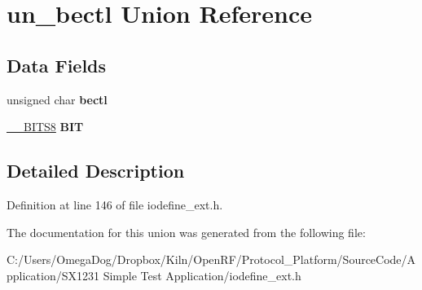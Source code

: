 \hypertarget{unionun__bectl}{\section{un\-\_\-bectl Union Reference}
\label{unionun__bectl}
}
\subsection*{Data Fields}
\begin{DoxyCompactItemize}
\item 
\hypertarget{unionun__bectl_ad48fc3a2177adbc06fa25a6989e27ea1}{unsigned char {\bfseries bectl}}\label{unionun__bectl_ad48fc3a2177adbc06fa25a6989e27ea1}

\item 
\hypertarget{unionun__bectl_a1b02bf44a82cf6adfa1c7c9011f4675c}{\hyperlink{struct_____b_i_t_s8}{\-\_\-\-\_\-\-B\-I\-T\-S8} {\bfseries B\-I\-T}}\label{unionun__bectl_a1b02bf44a82cf6adfa1c7c9011f4675c}

\end{DoxyCompactItemize}


\subsection{Detailed Description}


Definition at line 146 of file iodefine\-\_\-ext.\-h.



The documentation for this union was generated from the following file\-:\begin{DoxyCompactItemize}
\item 
C\-:/\-Users/\-Omega\-Dog/\-Dropbox/\-Kiln/\-Open\-R\-F/\-Protocol\-\_\-\-Platform/\-Source\-Code/\-Application/\-S\-X1231 Simple Test Application/iodefine\-\_\-ext.\-h\end{DoxyCompactItemize}
